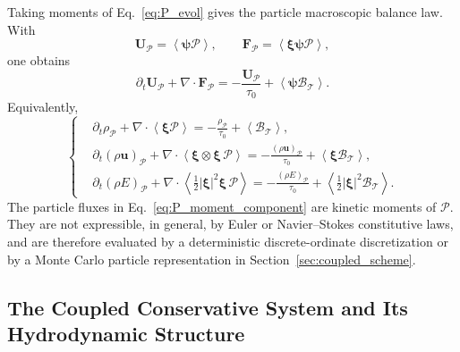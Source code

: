 \documentclass[preprint,12pt]{elsarticle}
\begin{document}
Taking moments of Eq.~\eqref{eq:P_evol} gives the particle macroscopic balance law. With
\begin{equation}
    \mathbf U_{\mathcal{P}}=\left\langle \boldsymbol{\psi}\mathcal{P} \right\rangle,
    \qquad
    \mathbf F_{\mathcal{P}}=\left\langle \boldsymbol{\xi}\boldsymbol{\psi}\mathcal{P} \right\rangle,
\end{equation}
one obtains
\begin{equation}\label{eq:P_moment_equation}
    \partial_t\mathbf U_{\mathcal{P}}+\nabla\cdot\mathbf F_{\mathcal{P}}
    =
    -\frac{\mathbf U_{\mathcal{P}}}{\tau_0}
    +\left\langle \boldsymbol{\psi}\mathcal B_\mathcal{T} \right\rangle.
\end{equation}
Equivalently,
\begin{equation}\label{eq:P_moment_component}
\left\{
\begin{aligned}
&\partial_t\rho_{\mathcal{P}}+\nabla\cdot\left\langle \boldsymbol{\xi}\mathcal{P} \right\rangle
    =
    -\frac{\rho_{\mathcal{P}}}{\tau_0}
    +\left\langle \mathcal B_\mathcal{T} \right\rangle,\\
&\partial_t(\rho\boldsymbol{u})_{\mathcal{P}}+\nabla\cdot\left\langle \boldsymbol{\xi}\otimes\boldsymbol{\xi}\,\mathcal{P} \right\rangle
    =
    -\frac{(\rho\boldsymbol{u})_{\mathcal{P}}}{\tau_0}
    +\left\langle \boldsymbol{\xi}\mathcal B_\mathcal{T} \right\rangle,\\
&\partial_t(\rho E)_{\mathcal{P}}
    +\nabla\cdot\left\langle \frac{1}{2}|\boldsymbol{\xi}|^2\boldsymbol{\xi}\,\mathcal{P} \right\rangle
    =
    -\frac{(\rho E)_{\mathcal{P}}}{\tau_0}
    +\left\langle \frac{1}{2}|\boldsymbol{\xi}|^2\mathcal B_\mathcal{T} \right\rangle.
\end{aligned}
\right.
\end{equation}
The particle fluxes in Eq.~\eqref{eq:P_moment_component} are kinetic moments of $\mathcal{P}$. They are not expressible, in general, by Euler or Navier--Stokes constitutive laws, and are therefore evaluated by a deterministic discrete-ordinate discretization or by a Monte Carlo particle representation in Section~\ref{sec:coupled_scheme}.

\subsection{The Coupled Conservative System and Its Hydrodynamic Structure}\label{sec:wpd}\label{sec:hydro_structure}
\end{document}
